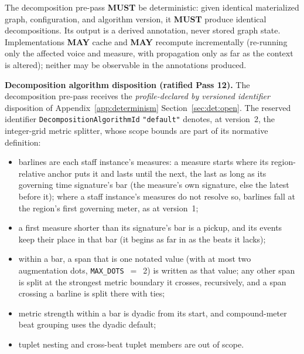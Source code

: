 \documentclass[11pt,letterpaper]{report}
\newcounter{requirement}[chapter]
\newcommand{\MUST}{\textbf{MUST}}
\newcommand{\MAY}{\textbf{MAY}}
\begin{document}
\begin{requirement}
  \label{req:time:decomposition-determinism}
  The decomposition pre-pass \MUST{} be deterministic: given
  identical materialized graph, configuration, and algorithm
  version, it \MUST{} produce identical decompositions. Its output
  is a derived annotation, never stored graph state. Implementations
  \MAY{} cache and \MAY{} recompute incrementally (re-running only
  the affected voice and measure, with propagation only as far as
  the context is altered); neither may be observable in the
  annotations produced.
\end{requirement}

\begin{requirement}
  \label{req:time:decomposition-algorithm}
  \textbf{Decomposition algorithm disposition (ratified Pass 12).}
  The decomposition pre-pass receives the \emph{profile-declared
  by versioned identifier} disposition of
  Appendix~\ref{app:determinism} Section~\ref{sec:det:open}. The
  reserved identifier \texttt{DecompositionAlgorithmId}
  \texttt{"default"} denotes, at version~2, the integer-grid
  metric splitter, whose scope bounds are part of its normative
  definition:
  \begin{itemize}
    \item barlines are each staff instance's measures: a measure
      starts where its region-relative anchor puts it and lasts until
      the next, the last as long as its governing time signature's bar
      (the measure's own signature, else the latest before it); where a
      staff instance's measures do not resolve so, barlines fall at the
      region's first governing meter, as at version~1;
    \item a first measure shorter than its signature's bar is a pickup,
      and its events keep their place in that bar (it begins as far in
      as the beats it lacks);
    \item within a bar, a span that is one notated value (with at most
      two augmentation dots, \texttt{MAX\_DOTS}~$=$~2) is written as that
      value; any other span is split at the strongest metric boundary it
      crosses, recursively, and a span crossing a barline is split there
      with ties;
    \item metric strength within a bar is dyadic from its start, and
      compound-meter beat grouping uses the dyadic default;
    \item tuplet nesting and cross-beat tuplet members are out of
      scope.
  \end{itemize}

\end{requirement}
\end{document}
